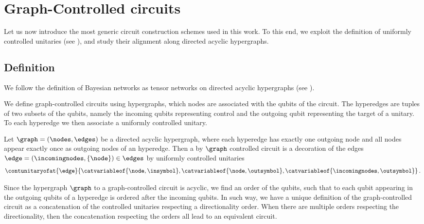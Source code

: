 \section{Graph-Controlled circuits}

Let us now introduce the most generic circuit construction schemes used in this work.
To this end, we exploit the definition of uniformly controlled unitaries (see \cite{mottonen_transformation_2005}), and study their alignment along directed acyclic hypergraphs.

\subsection{Definition}

We follow the definition of Bayesian networks as tensor networks on directed acyclic hypergraphs (see \cite{goessmann_tensor-network_2025}).

We define graph-controlled circuits using hypergraphs, which nodes are associated with the qubits of the circuit.
The hyperedges are tuples of two subsets of the qubits, namely the incoming qubits representing control and the outgoing qubit representing the target of a unitary.
To each hyperedge we then associate a uniformly controlled unitary.

\begin{definition}
    Let $\graph=(\nodes,\edges)$ be a directed acyclic hypergraph, where each hyperedge has exactly one outgoing node and all nodes appear exactly once as outgoing nodes of an hyperedge.
    Then a by $\graph$ controlled circuit is a decoration of the edges $\edge=(\incomingnodes,\{\node\})\in\edges$ by uniformly controlled unitaries
    \begin{align*}
        \contunitaryofat{\edge}{\catvariableof{\node,\insymbol},\catvariableof{\node,\outsymbol},\catvariableof{\incomingnodes,\outsymbol}} \, .
    \end{align*}
\end{definition}

Since the hypergraph $\graph$ to a graph-controlled circuit is acyclic, we find an order of the qubits, such that to each qubit appearing in the outgoing qubits of a hyperedge is ordered after the incoming qubits.
In such way, we have a unique definition of the graph-controlled circuit as a concatenation of the controlled unitaries respecting a directionality order.
When there are multiple orders respecting the directionality, then the concatenation respecting the orders all lead to an equivalent circuit.

